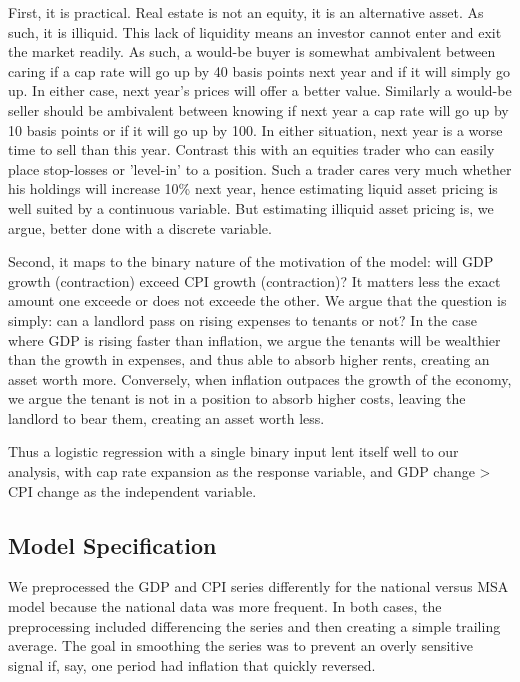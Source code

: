 First, it is practical. Real estate is not an equity, it is an alternative asset. As such, it is illiquid. This lack of liquidity means an investor cannot enter and exit the market readily. As such, a would-be buyer is somewhat ambivalent between caring if a cap rate will go up by 40 basis points next year and if it  will simply go up. In either case, next year's prices will offer a better value. Similarly a would-be seller should be ambivalent between knowing if next year a cap rate will go up by 10 basis points or if it will go up by 100. In either situation, next year is a worse time to sell than this year.  Contrast this with an equities trader who can easily place stop-losses or 'level-in' to a position. Such a trader cares very much whether his holdings will increase 10\% next year, hence estimating liquid asset pricing is well suited by a continuous variable. But estimating illiquid asset pricing is, we argue, better done with a discrete variable. 

Second, it maps to the binary nature of the motivation of the model: will GDP growth (contraction) exceed CPI growth (contraction)? It matters less the exact amount one exceede or does not exceede the other. We argue that the question is simply: can a landlord pass on rising expenses to tenants or not? In the case where GDP is rising faster than inflation, we argue the tenants will be wealthier than the growth in expenses, and thus able to absorb higher rents, creating an asset worth more. Conversely, when inflation outpaces the growth of the economy, we argue the tenant is not in a position to absorb higher costs, leaving the landlord to bear them, creating an asset worth less. 

Thus a logistic regression with a single binary input lent itself well to our analysis, with cap rate expansion as the response variable, and GDP change > CPI change as the independent variable. 

\subsection{Model Specification}

We preprocessed the GDP and CPI series differently for the national versus MSA model because the national data was more frequent. In both cases, the preprocessing included differencing the series and then creating a simple trailing average. The goal in smoothing the series was to prevent an overly sensitive signal if, say, one period had inflation that quickly reversed. 

